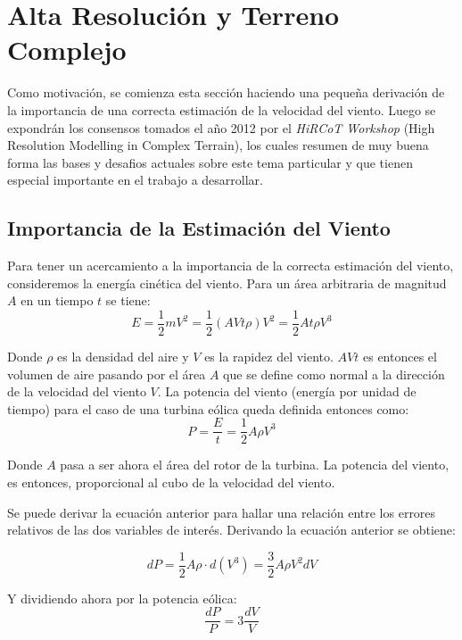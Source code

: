\section{Alta Resolución y Terreno Complejo}
Como motivación, se comienza esta sección haciendo una pequeña derivación de la importancia de una correcta estimación de la velocidad del viento. Luego se expondrán los consensos tomados el año 2012 por el \emph{HiRCoT Workshop} (High Resolution Modelling in Complex Terrain), los cuales resumen de muy buena forma las bases y desafios actuales sobre este tema particular y que tienen especial importante en el trabajo a desarrollar.
\subsection{Importancia de la Estimación del Viento}
Para tener un acercamiento a la importancia de la correcta estimación del viento, consideremos la energía cinética del viento. Para un área arbitraria de magnitud $A$ en un tiempo $t$ se tiene:
\begin{equation} 
E = \frac{1}{2}mV^2 = \frac{1}{2}(AVt\rho)V^2 = \frac{1}{2}At\rho V^3
\end{equation}

Donde $\rho$ es la densidad del aire y $V$ es la rapidez del viento. $AVt$ es entonces el volumen de aire pasando por el área $A$ que se define como normal a la dirección de la velocidad del viento $V$. La potencia del viento (energía por unidad de tiempo) para el caso de una turbina eólica queda definida entonces como:
\begin{equation}
P = \frac{E}{t} = \frac{1}{2}A\rho V^3
\end{equation}

Donde $A$ pasa a ser ahora el área del rotor de la turbina. La potencia del viento, es entonces, proporcional al cubo de la velocidad del viento.

Se puede derivar la ecuación anterior para hallar una relación entre los errores relativos de las dos variables de interés. Derivando la ecuación anterior se obtiene:

\begin{equation}
dP = \frac{1}{2}A\rho\cdot d(V^3) = \frac{3}{2}A\rho V^2 dV
\end{equation}

Y dividiendo ahora por la potencia eólica:
\begin{equation}
\frac{dP}{P} = 3\frac{dV}{V}
\end{equation}

